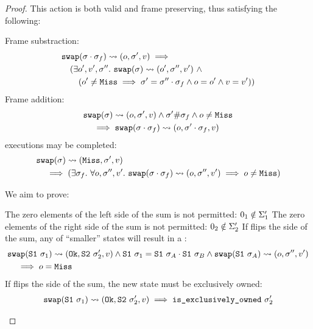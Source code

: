 \begin{proof}
This \swap{} action is both valid and frame preserving, thus satisfying the following:
\begin{hypvlist}
	 Frame substraction:
	\begin{align*}
		&\texttt{swap}(\sigma\cdot\sigma_f)\rightsquigarrow(o,\sigma',v)\implies\\
		&\quad(\exists o',v',\sigma''.~\texttt{swap}(\sigma)\rightsquigarrow(o',\sigma'',v')~\land\\
		&\qquad(o'\neq \texttt{Miss} \implies \sigma'=\sigma''\cdot\sigma_f\land o=o'\land v=v'))
	\end{align*}
	 Frame addition:
	\begin{align*}
		&\texttt{swap}(\sigma)\rightsquigarrow(o,\sigma',v)\land \sigma'\#\sigma_f\land o\neq\texttt{Miss}\\
		&\quad\implies \texttt{swap}(\sigma\cdot\sigma_f)\rightsquigarrow(o,\sigma'\cdot\sigma_f,v)
	\end{align*}
	 \Miss{} executions may be completed:
	\begin{align*}
		&\texttt{swap}(\sigma)\rightsquigarrow(\texttt{Miss},\sigma',v)\\
		&\quad\implies(\exists\sigma_f.~\forall o,\sigma'',v'.~\texttt{swap}(\sigma\cdot\sigma_f)\rightsquigarrow(o,\sigma'',v')\implies o\neq\texttt{Miss})
	\end{align*}

\end{hypvlist}

We aim to prove:
\begin{goalvlist}
     The zero elements of the left side of the sum is not permitted: $0_1\notin \Sigma_1'$
     The zero elements of the right side of the sum is not permitted: $0_2\notin \Sigma_2'$
     If \swap{} flips the side of the sum, any \swap{} of ``smaller'' states will result in a \Miss:
    \begin{align*}
    	&\texttt{swap}(\texttt{S1}~\sigma_1)\rightsquigarrow(\texttt{Ok},\texttt{S2}~\sigma_2',v)\land \texttt{S1}~\sigma_1 = \texttt{S1}~\sigma_A\cdot\texttt{S1}~\sigma_B \land \texttt{swap}(\texttt{S1}~\sigma_A)\rightsquigarrow(o,\sigma'',v') \\
    	&\quad\implies o = \texttt{Miss}
    \end{align*}
     If \swap{} flips the side of the sum, the new state must be exclusively owned:
    \begin{align*}
    	\texttt{swap}(\texttt{S1}~\sigma_1)\rightsquigarrow(\texttt{Ok},\texttt{S2}~\sigma_2',v) \implies \texttt{is\_exclusively\_owned}~\sigma_2'
    \end{align*}

\end{goalvlist}




\end{proof}
